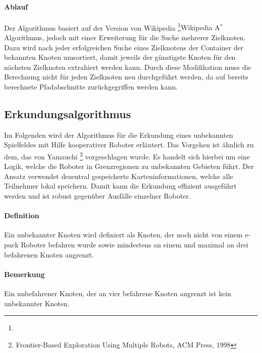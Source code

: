 \documentclass[10pt,a4paper]{article}
\begin{document}
		\paragraph{Ablauf}
			Der Algorithmus basiert auf der Version von Wikipedia
			\footnote{\astern}{Wikipedia A$^\ast$ Algorithmus},
			jedoch mit einer Erweiterung für die Suche mehrerer Zielknoten. Dazu wird nach jeder erfolgreichen Suche
			eines Zielknotens der Container der bekannten Knoten umsortiert, damit jeweils der günstigste Knoten für den
			nächsten Zielknoten extrahiert werden kann. Durch diese Modifikation muss die Berechnung nicht für jeden
			Zielknoten neu durchgeführt werden, da auf bereits berechnete Pfadabschnitte zurückgegriffen werden kann.

		\subsection{Erkundungsalgorithmus}
			Im Folgenden wird der Algorithmus für die Erkundung eines unbekannten Spielfeldes mit Hilfe kooperativer Roboter erläutert. Das
			Vorgehen ist ähnlich zu dem, das von Yamauchi	\footnote{Frontier-Based Exploration Using Multiple Robots, ACM Press, 1998}
			vorgeschlagen wurde. Es handelt sich hierbei um eine Logik, welche die Roboter in Grenzregionen zu unbekannten Gebieten führt.
			Der Ansatz verwendet dezentral gespeicherte Karteninformationen, welche alle Teilnehmer lokal speichern. Damit
			kann die Erkundung effizient ausgeführt werden und ist robust gegenüber Ausfälle einzelner Roboter.
			\paragraph*{Definition} Ein unbekannter Knoten wird definiert als Knoten, der noch nicht von einem e-puck Roboter befahren wurde
				sowie mindestens an einem und maximal an drei befahrenen Knoten angrenzt.
			\paragraph*{Bemerkung} Ein unbefahrener Knoten, der an vier befahrene Knoten angrenzt ist kein unbekannter Knoten.
\end{document}
